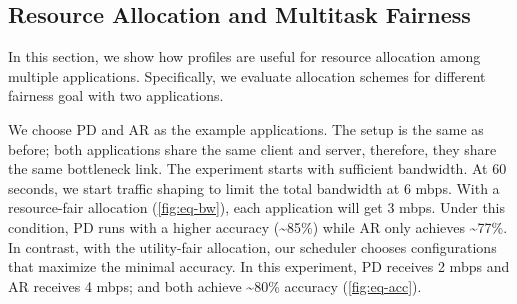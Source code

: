 \subsection{Resource Allocation and Multitask Fairness}
\label{sec:multi-task-alloc}

In this section, we show how profiles are useful for resource allocation among
multiple applications. Specifically, we evaluate allocation schemes for
different fairness goal with two applications.

We choose PD and AR as the example applications. The setup is the same as
before; both applications share the same client and server, therefore, they
share the same bottleneck link. The experiment starts with sufficient
bandwidth. At 60 seconds, we start traffic shaping to limit the total bandwidth
at 6 mbps. With a resource-fair allocation (\autoref{fig:eq-bw}), each
application will get 3 mbps. Under this condition, PD runs with a higher
accuracy (\textasciitilde 85\%) while AR only achieves \textasciitilde 77\%. In
contrast, with the utility-fair allocation, our scheduler chooses configurations
that maximize the minimal accuracy. In this experiment, PD receives 2 mbps and
AR receives 4 mbps; and both achieve \textasciitilde 80\% accuracy
(\autoref{fig:eq-acc}).

